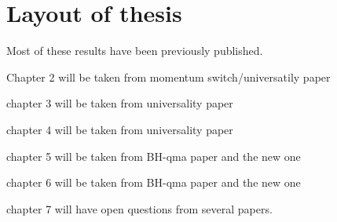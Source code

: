 \documentclass[../thesis-main/thesis-main]{subfiles}
\begin{document}
\section{Layout of thesis}

Most of these results have been previously published.

Chapter 2 will be taken from momentum switch/universatily paper

chapter 3 will be taken from universality paper

chapter 4 will be taken from universality paper

chapter 5 will be taken from BH-qma paper and the new one

chapter 6 will be taken from BH-qma paper and the new one

chapter 7 will have open questions from several papers.
\end{document}
